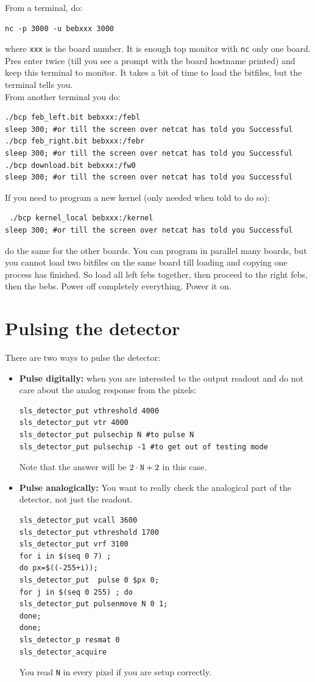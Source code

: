 \documentclass{article}
\begin{document}
From a terminal, do:
\begin{verbatim}
nc -p 3000 -u bebxxx 3000 
\end{verbatim} 
where {\tt{xxx}} is the board number. It is enough top monitor with {\tt{nc}} only one board. Pres enter twice (till you see a prompt with the board hostname printed) and keep this terminal to monitor. It takes a bit of time to load the bitfiles, but the terminal tells you.\\
From another terminal you do:
\begin{verbatim}
./bcp feb_left.bit bebxxx:/febl
sleep 300; #or till the screen over netcat has told you Successful
./bcp feb_right.bit bebxxx:/febr
sleep 300; #or till the screen over netcat has told you Successful
./bcp download.bit bebxxx:/fw0
sleep 300; #or till the screen over netcat has told you Successful
\end{verbatim}
If you need to program a new kernel (only needed when told to do so):
\begin{verbatim}
 ./bcp kernel_local bebxxx:/kernel
sleep 300; #or till the screen over netcat has told you Successful
\end{verbatim}
do the same for the other boards. You can program in parallel many boards, but you cannot load two bitfiles on the same board till loading and copying one process has finished. So load all left febs together, then proceed to the right febs, then the bebs. Power off completely everything. Power it on.

\section{Pulsing the detector}
There are two ways to pulse the detector: 
\begin{itemize}
\item \textbf{Pulse digitally:} when you are interested to the output readout and do not care about the analog response from the pixels:
 \begin{verbatim}
sls_detector_put vthreshold 4000
sls_detector_put vtr 4000
sls_detector_put pulsechip N #to pulse N
sls_detector_put pulsechip -1 #to get out of testing mode 
\end{verbatim}
Note that the answer will be $2 \cdot \textrm{{\tt{N}}} +2$ in this case.

\item  \textbf{Pulse analogically:} You want to really check the analogical part of the detector, not just the readout.

 \begin{verbatim}
sls_detector_put vcall 3600
sls_detector_put vthreshold 1700
sls_detector_put vrf 3100
for i in $(seq 0 7) ; 
do px=$((-255+i)); 
sls_detector_put  pulse 0 $px 0;
for j in $(seq 0 255) ; do
sls_detector_put pulsenmove N 0 1;
done;
done;
sls_detector_p resmat 0
sls_detector_acquire
\end{verbatim}
You read {\tt{N}} in every pixel if you are setup correctly. 
\end{itemize}
 
\end{document}
